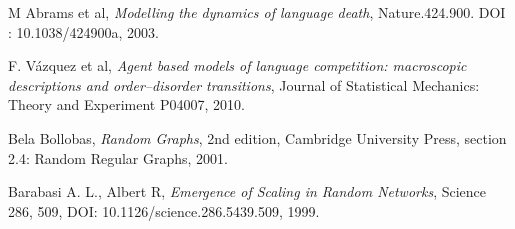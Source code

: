 \documentclass[english]{cccconf}
\begin{document}
\begin{thebibliography}{0}
M Abrams et al, \textit{Modelling the dynamics of language death}, Nature.424.900. DOI : 10.1038/424900a, 2003.

 F. V{\'a}zquez et al, \textit{Agent based models of language competition: macroscopic descriptions and order–disorder transitions}, Journal of Statistical Mechanics: Theory and Experiment P04007, 2010.

 Bela Bollobas, \textit{Random Graphs}, 2nd edition, Cambridge University Press, section 2.4: Random Regular Graphs, 2001.

Barabasi A. L., Albert R, \textit{Emergence of Scaling in Random Networks}, Science 286, 509, DOI: 10.1126/science.286.5439.509, 1999.



\end{thebibliography}
\end{document}

